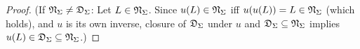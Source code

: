 \begin{enumerate}[{5.}1. ]
\begin{enumerate}[(a)]
\begin{proof}
(If $\mathfrak{N}_\Sigma\neq\mathfrak{D}_\Sigma$: Let $L\in\mathfrak{N}_\Sigma$.  Since $u(L)\in\mathfrak{N}_\Sigma$ iff $u(u(L))=L\in\mathfrak{N}_\Sigma$ (which holds), and $u$ is its own inverse, closure of $\mathfrak{D}_\Sigma$ under $u$ and $\mathfrak{D}_\Sigma\subseteq\mathfrak{N}_\Sigma$ implies $u(L)\in\mathfrak{D}_\Sigma\subseteq\mathfrak{N}_\Sigma$.)
\end{proof}

\end{enumerate}

\end{enumerate}

